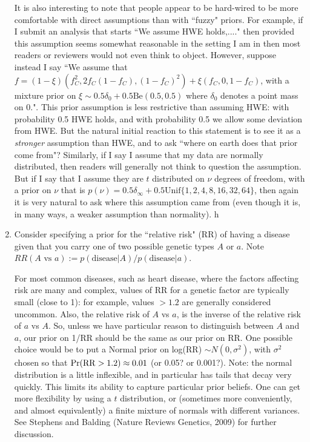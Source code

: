 \documentclass[12pt]{article}
\def\Be{\text{Be}}
\begin{document}
\begin{enumerate}
It is also interesting to note that people appear to be hard-wired to be more comfortable with direct assumptions than with ``fuzzy" priors.
For example, if I submit an analysis that starts ``We assume HWE holds,...." then provided this assumption seems somewhat reasonable in the
setting I am in then most readers or reviewers would not even think to object. However, suppose instead I say
``We assume that $f=(1-\xi)(f_C^2, 2f_C(1-f_C),(1-f_C)^2) + \xi(f_C,0,1-f_C)$,
with a mixture prior on $\xi \sim 0.5 \delta_0 + 0.5 \Be(0.5,0.5)$ where $\delta_0$ denotes a point mass on 0.". This prior assumption is
less restrictive than assuming HWE: with probability 0.5 HWE holds, and with probability 0.5 we allow some deviation from HWE. But
the natural initial reaction to this statement is to see it as a {\it stronger} assumption than HWE, and to ask ``where on earth does that prior come from"?
Similarly, if I say I assume that my data are normally distributed, then readers will generally not think to question the assumption. But if I say that I assume
they are $t$ distributed on $\nu$ degrees of freedom, with a prior on $\nu$ that is $p(\nu)= 0.5\delta_\infty + 0.5 \text{Unif}\{1,2,4,8,16,32,64\}$,
then again it is very natural to ask where this assumption came from (even though it is, in many ways, a weaker assumption than normality).
h    
  \item Consider specifying a prior for the ``relative risk" (RR) of having a disease given that you carry one of two possible genetic types $A$ or $a$. Note $RR(A \mbox{ vs } a) := p(\mbox{disease} | A)/p(\mbox{disease} | a)$.
  
For most common diseases, such as heart disease, where the factors affecting risk
are many and complex, values of RR for a genetic factor are typically small (close to 1): for example, values $>1.2$ are generally considered uncommon. Also,
the relative risk of $A$ vs $a$, is the inverse of the relative risk of $a$ vs $A$.  So, unless we have particular reason to distinguish between $A$ and $a$, our prior on 1/RR should be the same as our prior on RR. One possible choice would be to put a Normal prior on log(RR) $\sim N(0,\sigma^2)$, with $\sigma^2$ chosen
so that $\Pr({\rm RR} >1.2) \approx 0.01$ (or 0.05? or 0.001?). 
Note: the normal distribution is a little inflexible,
and in particular has tails that decay very quickly.
This limits its ability to capture particular prior beliefs.
One can get more flexibility by using a $t$ distribution, or (sometimes more conveniently, and almost equivalently) a finite mixture of normals with different variances. See Stephens and Balding (Nature Reviews Genetics, 2009) for further discussion.
 \end{enumerate}
\end{document}
